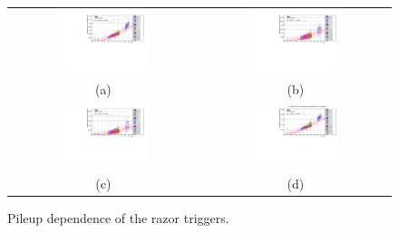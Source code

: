 \begin{figure}[ht!]
\begin{tabular}{cc}
\centering 
\includegraphics[width=0.49\textwidth]{figs/hlt13TeV/linear/HLT_RsqMR240_Rsq0p09_MR200_instLumi_vs_rawRate.pdf}
  & \includegraphics[width=0.49\textwidth]{figs/hlt13TeV/linear/HLT_RsqMR240_Rsq0p09_MR200_4jet_instLumi_vs_rawRate.pdf}\\
(a) & (b)\\
\includegraphics[width=0.49\textwidth]{figs/hlt13TeV/linear/HLT_Rsq0p25_instLumi_vs_rawRate.pdf}
  &\includegraphics[width=0.49\textwidth]{figs/hlt13TeV/nonlinear/HLT_Rsq0p02_MR300_TriPFJet80_60_40_DoublePFBTagCSV0p7_0p4_Mbb60_200_instLumi_vs_rawRate.pdf}\\
(c) & (d)
\end{tabular}
\caption{\label{fig:HLTpileup} Pileup dependence of the razor triggers.}
\end{figure}


